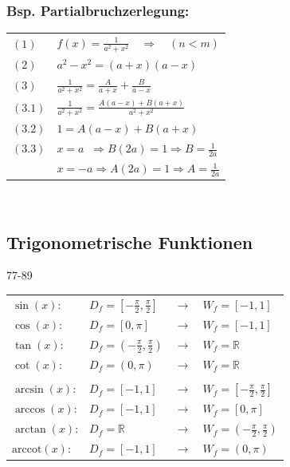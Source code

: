 \subsubsection*{Bsp. Partialbruchzerlegung:}
\begin{tabular}{l l}
    $(1)$   & $ f(x) = \frac{1}{a^2+x^2} \quad \Rightarrow \quad (n < m)$\\
    $(2)$   & $a^2-x^2 = (a + x)(a - x)$\\
    $(3)$   & $\frac{1}{a^2+x^2}  = \frac{A}{a + x} + \frac{B}{a - x}$\\
    $(3.1)$ & $\frac{1}{a^2+x^2} = \frac{A(a - x) + B(a + x)}{a^2+x^2}$\\
    $(3.2)$ & $1 = A(a - x) + B(a + x)$\\
    $(3.3)$ & $x = a \;\;\Rightarrow B(2a) = 1 \Rightarrow B = \frac{1}{2a}$\\
            & $x = -a  \Rightarrow A(2a) = 1 \Rightarrow A = \frac{1}{2a}$\\
\end{tabular}\\

\subsection{Trigonometrische Funktionen}{77-89}

\renewcommand{\arraystretch}{1.1}
\begin{tabular}{llll}

    $\sin(x)$:      & $D_f=[-\frac{\pi}{2},\frac{\pi}{2}]$ & $\rightarrow$ &  $W_f=[-1,1]$ \\
    $\cos(x)$:      & $D_f=[0,\pi]$ & $\rightarrow$ &  $W_f=[-1,1]$  \\
    $\tan(x)$:      & $D_f=(-\frac{\pi}{2},\frac{\pi}{2})$ & $\rightarrow$ & $W_f=\mathbb{R}$\\
    $\cot(x)$:      & $D_f=(0,\pi)$ & $\rightarrow$ &  $W_f=\mathbb{R}$ \\
    \\
    $\arcsin(x)$:   & $D_f=[-1,1] $ & $\rightarrow$ & $ W_f=[-\frac{\pi}{2},\frac{\pi}{2}]$ \\
    $\arccos(x)$:   & $D_f=[-1,1]$ & $\rightarrow$ &  $W_f=[0,\pi]$ \\
    $\arctan(x)$:   & $D_f=\mathbb{R}$ & $\rightarrow$ &  $W_f=(-\frac{\pi}{2},\frac{\pi}{2})$ \\
    $\mathrm{arccot}(x)$: & $D_f=[-1,1]$ & $\rightarrow$ &  $W_f=(0,\pi)$ \\		
\end{tabular}\\

